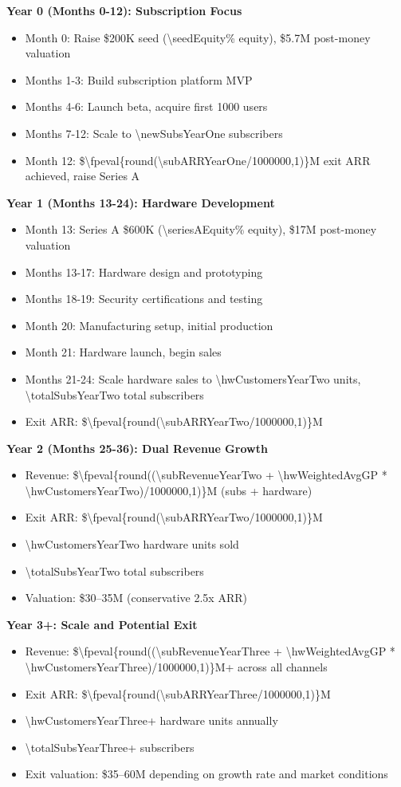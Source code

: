 \documentclass[11pt]{article}
\newcommand{\numfpeval}[1]{\num{\fpeval{#1}}}
\begin{document}
\textbf{Year 0 (Months 0-12): Subscription Focus}
\begin{itemize}
  \item Month 0: Raise \$\num{200}K seed (\num{\seedEquity}\% equity), \$\num{5.7}M post-money valuation
  \item Months 1-3: Build subscription platform MVP
  \item Months 4-6: Launch beta, acquire first \num{1000} users
  \item Months 7-12: Scale to \num{\newSubsYearOne} subscribers
  \item Month 12: \$\numfpeval{round(\subARRYearOne/1000000,1)}M exit ARR achieved, raise Series A
\end{itemize}

\textbf{Year 1 (Months 13-24): Hardware Development}
\begin{itemize}
  \item Month 13: Series A \$\num{600}K (\num{\seriesAEquity}\% equity), \$\num{17}M post-money valuation
  \item Months 13-17: Hardware design and prototyping
  \item Months 18-19: Security certifications and testing
  \item Month 20: Manufacturing setup, initial production
  \item Month 21: Hardware launch, begin sales
  \item Months 21-24: Scale hardware sales to \num{\hwCustomersYearTwo} units, \num{\totalSubsYearTwo} total subscribers
  \item Exit ARR: \$\numfpeval{round(\subARRYearTwo/1000000,1)}M
\end{itemize}

\textbf{Year 2 (Months 25-36): Dual Revenue Growth}
\begin{itemize}
  \item Revenue: \$\numfpeval{round((\subRevenueYearTwo + \hwWeightedAvgGP * \hwCustomersYearTwo)/1000000,1)}M (subs + hardware)
  \item Exit ARR: \$\numfpeval{round(\subARRYearTwo/1000000,1)}M
  \item \num{\hwCustomersYearTwo} hardware units sold
  \item \num{\totalSubsYearTwo} total subscribers
  \item Valuation: \$\num{30}--\num{35}M (conservative \num{2.5}x ARR)
\end{itemize}

\textbf{Year 3+: Scale and Potential Exit}
\begin{itemize}
  \item Revenue: \$\numfpeval{round((\subRevenueYearThree + \hwWeightedAvgGP * \hwCustomersYearThree)/1000000,1)}M+ across all channels
  \item Exit ARR: \$\numfpeval{round(\subARRYearThree/1000000,1)}M
  \item \num{\hwCustomersYearThree}+ hardware units annually
  \item \num{\totalSubsYearThree}+ subscribers
  \item Exit valuation: \$\num{35}--\num{60}M depending on growth rate and market conditions
\end{itemize}
\end{document}

